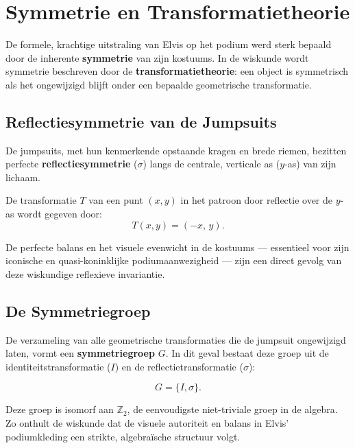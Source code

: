 \documentclass{book}
\begin{document}
\section{Symmetrie en Transformatietheorie}

De formele, krachtige uitstraling van Elvis op het podium werd sterk bepaald door de inherente \textbf{symmetrie} van zijn kostuums. In de wiskunde wordt symmetrie beschreven door de \textbf{transformatietheorie}: een object is symmetrisch als het ongewijzigd blijft onder een bepaalde geometrische transformatie.

\subsection{Reflectiesymmetrie van de Jumpsuits}

De jumpsuits, met hun kenmerkende opstaande kragen en brede riemen, bezitten perfecte \textbf{reflectiesymmetrie} ($\sigma$) langs de centrale, verticale as ($y$-as) van zijn lichaam.

De transformatie $T$ van een punt $(x,y)$ in het patroon door reflectie over de $y$-as wordt gegeven door:
\[
T(x,y) = (-x,\, y).
\]

De perfecte balans en het visuele evenwicht in de kostuums --- essentieel voor zijn iconische en quasi-koninklijke podiumaanwezigheid --- zijn een direct gevolg van deze wiskundige reflexieve invariantie.

\subsection{De Symmetriegroep}

De verzameling van alle geometrische transformaties die de jumpsuit ongewijzigd laten, vormt een \textbf{symmetriegroep} $G$. In dit geval bestaat deze groep uit de identiteitstransformatie ($I$) en de reflectietransformatie ($\sigma$):

\[
G = \{ I, \sigma \}.
\]

Deze groep is isomorf aan $\mathbb{Z}_2$, de eenvoudigste niet-triviale groep in de algebra. Zo onthult de wiskunde dat de visuele autoriteit en balans in Elvis' podiumkleding een strikte, algebra\"ische structuur volgt.
\end{document}
